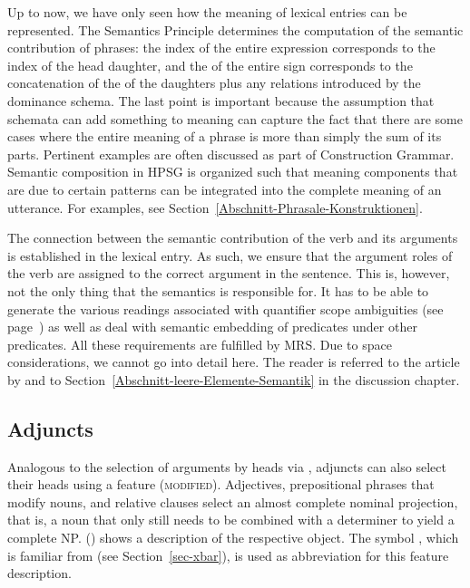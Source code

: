 Up to now, we have only seen how the meaning of lexical entries can be represented. The Semantics Principle
determines the computation of the semantic contribution of phrases: the index of the entire expression corresponds to the index of
the head daughter, and the \relsv of the entire sign corresponds to the concatenation of the \relsvs of the daughters plus any relations
introduced by the dominance schema. The last point is important because the assumption that schemata can add something to meaning can capture
the fact that there are some cases where the entire meaning of a phrase is more than simply the sum of its parts.
Pertinent examples are often discussed as part of Construction Grammar\indexcxg. Semantic
composition in HPSG is organized such that meaning components that are due to certain patterns can be integrated into the complete meaning of an utterance. For examples, see Section~\ref{Abschnitt-Phrasale-Konstruktionen}.

\addlines[-1]
The connection between the semantic contribution of the verb and its arguments is established in the lexical entry.
As such, we ensure that the argument roles of the verb are assigned to the correct argument in the sentence. This is, however, not the only
thing that the semantics is responsible for. It has to be able to generate the various readings associated with quantifier scope ambiguities 
(see page~\pageref{Beispiel-Every-man-loves-a-woman}) as well as deal with semantic embedding of predicates under other predicates. All these
requirements are fulfilled by MRS. Due to space considerations, we cannot go into detail here. The reader is referred to the article by
\citet*{CFPS2005a} and to Section~\ref{Abschnitt-leere-Elemente-Semantik} in the discussion chapter.



\subsection{Adjuncts}
\label{Abschnitt-HPSG-Adjunkte}\label{sec-adjuncts-hpsg}

Analogous to the selection of arguments by heads via \comps, adjuncts can also select their heads using a feature (\textsc{modified}).
Adjectives, prepositional phrases that modify nouns, and relative clauses select an almost complete nominal projection, that is, a noun that only still needs to
be combined with a determiner to yield a complete NP. () shows a description of the respective 
object. The symbol \nbar, which is familiar from \xbart (see Section~\ref{sec-xbar}), is used as abbreviation
for this feature description.

